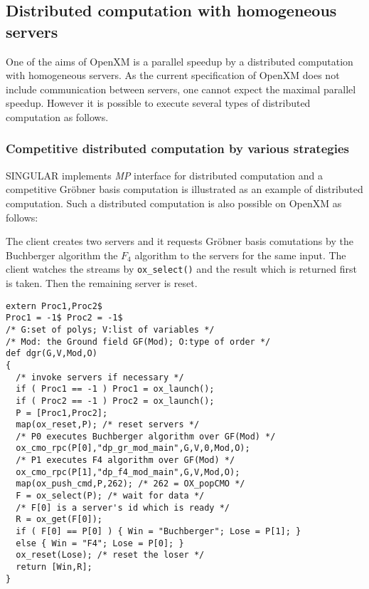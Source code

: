 
\subsection{Distributed computation with homogeneous servers}
\label{section:homog}

One of the aims of OpenXM is a parallel speedup by a distributed computation
with homogeneous servers. As the current specification of OpenXM does
not include communication between servers, one cannot expect
the maximal parallel speedup. However it is possible to execute
several types of distributed computation as follows.

\subsubsection{Competitive distributed computation by various strategies}

SINGULAR \cite{Singular} implements {\it MP} interface for distributed
computation and a competitive Gr\"obner basis computation is
illustrated as an example of distributed computation.
Such a distributed computation is also possible on OpenXM as follows:

The client creates two servers and it requests 
Gr\"obner basis comutations by the Buchberger algorithm the $F_4$ algorithm
to the servers for the same input.
The client watches the streams by {\tt ox\_select()}
and the result which is returned first is taken. Then the remaining
server is reset.

\begin{verbatim}
extern Proc1,Proc2$
Proc1 = -1$ Proc2 = -1$
/* G:set of polys; V:list of variables */
/* Mod: the Ground field GF(Mod); O:type of order */
def dgr(G,V,Mod,O)
{
  /* invoke servers if necessary */
  if ( Proc1 == -1 ) Proc1 = ox_launch();
  if ( Proc2 == -1 ) Proc2 = ox_launch();
  P = [Proc1,Proc2];
  map(ox_reset,P); /* reset servers */
  /* P0 executes Buchberger algorithm over GF(Mod) */
  ox_cmo_rpc(P[0],"dp_gr_mod_main",G,V,0,Mod,O);
  /* P1 executes F4 algorithm over GF(Mod) */
  ox_cmo_rpc(P[1],"dp_f4_mod_main",G,V,Mod,O);
  map(ox_push_cmd,P,262); /* 262 = OX_popCMO */
  F = ox_select(P); /* wait for data */
  /* F[0] is a server's id which is ready */
  R = ox_get(F[0]);
  if ( F[0] == P[0] ) { Win = "Buchberger"; Lose = P[1]; }
  else { Win = "F4"; Lose = P[0]; }
  ox_reset(Lose); /* reset the loser */
  return [Win,R];
}
\end{verbatim}

